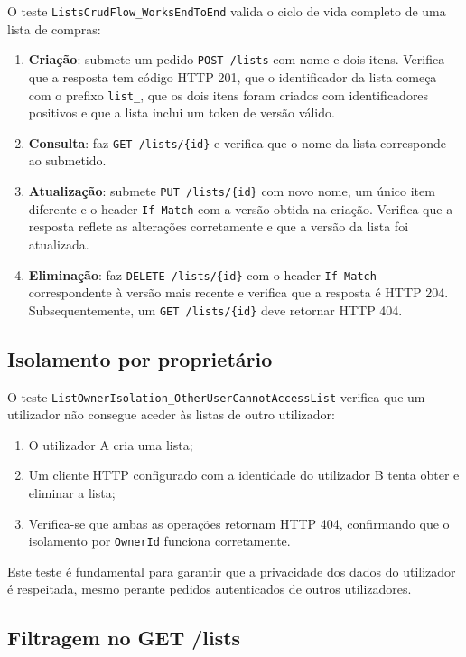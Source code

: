 O teste \texttt{ListsCrudFlow\_WorksEndToEnd} valida o ciclo de vida completo de uma lista de compras:

\begin{enumerate}
    \item \textbf{Criação}: submete um pedido \texttt{POST /lists} com nome e dois itens. Verifica que a resposta tem código HTTP 201, que o identificador da lista começa com o prefixo \texttt{list\_}, que os dois itens foram criados com identificadores positivos e que a lista inclui um token de versão válido.
    \item \textbf{Consulta}: faz \texttt{GET /lists/\{id\}} e verifica que o nome da lista corresponde ao submetido.
    \item \textbf{Atualização}: submete \texttt{PUT /lists/\{id\}} com novo nome, um único item diferente e o header \texttt{If-Match} com a versão obtida na criação. Verifica que a resposta reflete as alterações corretamente e que a versão da lista foi atualizada.
    \item \textbf{Eliminação}: faz \texttt{DELETE /lists/\{id\}} com o header \texttt{If-Match} correspondente à versão mais recente e verifica que a resposta é HTTP 204. Subsequentemente, um \texttt{GET /lists/\{id\}} deve retornar HTTP 404.
\end{enumerate}

\subsection{Isolamento por proprietário}
\label{sec:6.3.2}

O teste \texttt{ListOwnerIsolation\_OtherUserCannotAccessList} verifica que um utilizador não consegue aceder às listas de outro utilizador:

\begin{enumerate}
    \item O utilizador A cria uma lista;
    \item Um cliente HTTP configurado com a identidade do utilizador B tenta obter e eliminar a lista;
    \item Verifica-se que ambas as operações retornam HTTP 404, confirmando que o isolamento por \texttt{OwnerId} funciona corretamente.
\end{enumerate}

Este teste é fundamental para garantir que a privacidade dos dados do utilizador é respeitada, mesmo perante pedidos autenticados de outros utilizadores.

\subsection{Filtragem no GET /lists}
\label{sec:6.3.3}


